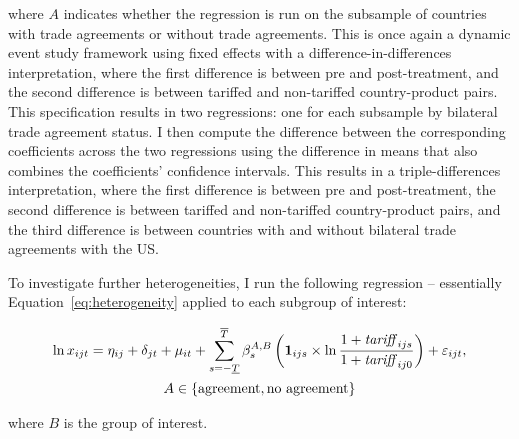 where $A$ indicates whether the regression is run on the subsample of countries with trade agreements or without trade agreements. This is once again a dynamic event study framework using fixed effects with a difference-in-differences interpretation, where the first difference is between pre and post-treatment, and the second difference is between tariffed and non-tariffed country-product pairs. This specification results in two regressions: one for each subsample by bilateral trade agreement status. I then compute the difference between the corresponding coefficients across the two regressions using the difference in means that also combines the coefficients' confidence intervals. This results in a triple-differences interpretation, where the first difference is between pre and post-treatment, the second difference is between tariffed and non-tariffed country-product pairs, and the third difference is between countries with and without bilateral trade agreements with the US. 

To investigate further heterogeneities, I run the following regression -- essentially Equation~\ref{eq:heterogeneity} applied to each subgroup of interest: 

    \begin{equation}
        \begin{gathered}
            \ln x_{ijt} = \eta_{ij} + \delta_{jt} + \mu_{it} + \sum_{s = -\underline{T}}^{\overline{T}} \beta_s^{A,B} \left( \mathbf{1}_{ijs} \times \ln \frac{1 + \mathit{tariff}_{ijs}}{1 + \mathit{tariff}_{ij0}} \right) + \varepsilon_{ijt}, \\
            A \in \{\textnormal{agreement}, \textnormal{no agreement}\}
        \end{gathered}
        \label{eq:heterogeneity}
    \end{equation}

where $B$ is the group of interest. 

